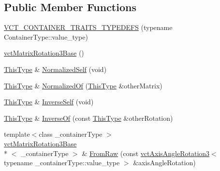 \subsection*{Public Member Functions}
\begin{DoxyCompactItemize}
\item 
\hyperlink{classvct_matrix_rotation3_base_a81f2ff9ba837b0b062fdcafb9a8fcdfc}{V\-C\-T\-\_\-\-C\-O\-N\-T\-A\-I\-N\-E\-R\-\_\-\-T\-R\-A\-I\-T\-S\-\_\-\-T\-Y\-P\-E\-D\-E\-F\-S} (typename Container\-Type\-::value\-\_\-type)
\item 
\hyperlink{classvct_matrix_rotation3_base_a38b1463ff78213b73bc2b861e2011c86}{vct\-Matrix\-Rotation3\-Base} ()
\item 
\hyperlink{classvct_matrix_rotation3_base_a027be766cb10ca3c2ad8e85c28ed0af9}{This\-Type} \& \hyperlink{classvct_matrix_rotation3_base_a13c2e22df6afe87cbe9c61375913d82e}{Normalized\-Self} (void)
\item 
\hyperlink{classvct_matrix_rotation3_base_a027be766cb10ca3c2ad8e85c28ed0af9}{This\-Type} \& \hyperlink{classvct_matrix_rotation3_base_abd6eeb56b507792f9fb8421827ea3dcd}{Normalized\-Of} (\hyperlink{classvct_matrix_rotation3_base_a027be766cb10ca3c2ad8e85c28ed0af9}{This\-Type} \&other\-Matrix)
\item 
\hyperlink{classvct_matrix_rotation3_base_a027be766cb10ca3c2ad8e85c28ed0af9}{This\-Type} \& \hyperlink{classvct_matrix_rotation3_base_af8390b4abcbcb6f7f64dd6b53d4a7e01}{Inverse\-Self} (void)
\item 
\hyperlink{classvct_matrix_rotation3_base_a027be766cb10ca3c2ad8e85c28ed0af9}{This\-Type} \& \hyperlink{classvct_matrix_rotation3_base_a33574e4e0b99cb0925ffd12776d2b907}{Inverse\-Of} (const \hyperlink{classvct_matrix_rotation3_base_a027be766cb10ca3c2ad8e85c28ed0af9}{This\-Type} \&other\-Rotation)
\item 
{\footnotesize template$<$class \-\_\-container\-Type $>$ }\\\hyperlink{classvct_matrix_rotation3_base}{vct\-Matrix\-Rotation3\-Base}\\*
$<$ \-\_\-container\-Type $>$ \& \hyperlink{classvct_matrix_rotation3_base_a1bfb155585ea99b14ae5543e4b5ae928}{From\-Raw} (const \hyperlink{classvct_axis_angle_rotation3}{vct\-Axis\-Angle\-Rotation3}$<$ typename \-\_\-container\-Type\-::value\-\_\-type $>$ \&axis\-Angle\-Rotation)
\end{DoxyCompactItemize}

